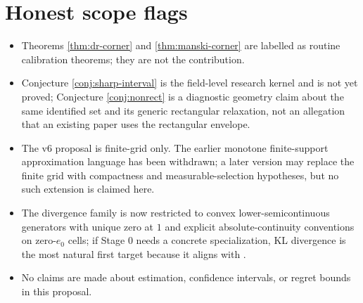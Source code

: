 \documentclass[11pt]{article}
\theoremstyle{definition}
\theoremstyle{plain}
\theoremstyle{remark}
\begin{document}
\section{Honest scope flags}
\begin{itemize}[leftmargin=*]
\item Theorems \ref{thm:dr-corner} and \ref{thm:manski-corner} are labelled as routine calibration theorems; they are not the contribution.
\item Conjecture \ref{conj:sharp-interval} is the field-level research kernel and is not yet proved; Conjecture \ref{conj:nonrect} is a diagnostic geometry claim about the same identified set and its generic rectangular relaxation, not an allegation that an existing paper uses the rectangular envelope.
\item The v6 proposal is finite-grid only. The earlier monotone finite-support approximation language has been withdrawn; a later version may replace the finite grid with compactness and measurable-selection hypotheses, but no such extension is claimed here.
\item The divergence family is now restricted to convex lower-semicontinuous generators with unique zero at $1$ and explicit absolute-continuity conventions on zero-$e_0$ cells; if Stage 0 needs a concrete specialization, KL divergence is the most natural first target because it aligns with \citet{KallusMaoWangZhou2022}.
\item No claims are made about estimation, confidence intervals, or regret bounds in this proposal.
\end{itemize}
\end{document}
